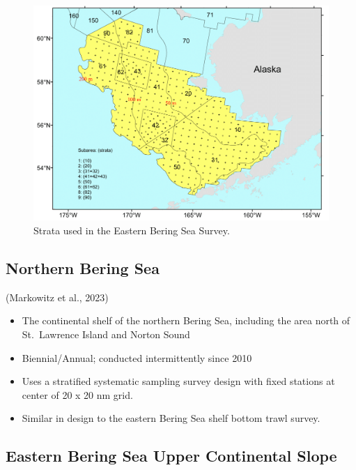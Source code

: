 \documentclass[
  letterpaper,
  oneside,
  open=any]{scrbook}
\providecommand{\tightlist}{%
  \setlength{\itemsep}{0pt}\setlength{\parskip}{0pt}}\usepackage{longtable,booktabs,array}
\begin{document}
\begin{figure}

{\centering \includegraphics[width=7.19in,height=\textheight]{content/../img/ebs-strata.png}

}

\caption{Strata used in the Eastern Bering Sea Survey.}

\end{figure}

\hypertarget{northern-bering-sea}{%
\subsection{\texorpdfstring{\textbf{Northern Bering
Sea}}{Northern Bering Sea}}\label{northern-bering-sea}}

(Markowitz et al., 2023)

\begin{itemize}
\tightlist
\item
  The continental shelf of the northern Bering Sea, including the area
  north of St.~Lawrence Island and Norton Sound
\item
  Biennial/Annual; conducted intermittently since 2010
\item
  Uses a stratified systematic sampling survey design with fixed
  stations at center of 20 x 20 nm grid.
\item
  Similar in design to the eastern Bering Sea shelf bottom trawl survey.
\end{itemize}

\hypertarget{eastern-bering-sea-upper-continental-slope}{%
\subsection{\texorpdfstring{\textbf{Eastern Bering Sea Upper Continental
Slope}}{Eastern Bering Sea Upper Continental Slope}}\label{eastern-bering-sea-upper-continental-slope}}
\end{document}
